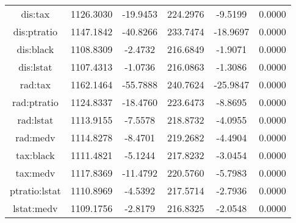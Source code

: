 \begin{longtable}{c|c|c|c|c|c}
       dis:tax & 1126.3030 &  -19.9453 & 224.2976 &   -9.5199 &          0.0000 \\
   dis:ptratio & 1147.1842 &  -40.8266 & 233.7474 &  -18.9697 &          0.0000 \\
     dis:black & 1108.8309 &   -2.4732 & 216.6849 &   -1.9071 &          0.0000 \\
     dis:lstat & 1107.4313 &   -1.0736 & 216.0863 &   -1.3086 &          0.0000 \\
       rad:tax & 1162.1464 &  -55.7888 & 240.7624 &  -25.9847 &          0.0000 \\
   rad:ptratio & 1124.8337 &  -18.4760 & 223.6473 &   -8.8695 &          0.0000 \\
     rad:lstat & 1113.9155 &   -7.5578 & 218.8732 &   -4.0955 &          0.0000 \\
      rad:medv & 1114.8278 &   -8.4701 & 219.2682 &   -4.4904 &          0.0000 \\
     tax:black & 1111.4821 &   -5.1244 & 217.8232 &   -3.0454 &          0.0000 \\
      tax:medv & 1117.8369 &  -11.4792 & 220.5760 &   -5.7983 &          0.0000 \\
 ptratio:lstat & 1110.8969 &   -4.5392 & 217.5714 &   -2.7936 &          0.0000 \\
    lstat:medv & 1109.1756 &   -2.8179 & 216.8325 &   -2.0548 &          0.0000 \\
\end{longtable}
